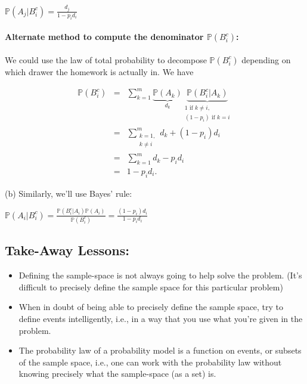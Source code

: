 \documentclass[6008notes.tex]{subfiles}
\begin{document}
{\centering$\mathbb {P}(A_ j|B_ i^ c) = \frac{d_ j}{1-p_ i d_ i}$ \par}
 
\paragraph{Alternate method to compute the denominator $\mathbb {P}(B_ i^ c)$:} We could use the law of total probability to decompose $\mathbb {P}(B_ i^ c)$ depending on which drawer the homework is actually in. We have

\begin{eqnarray*}
        \mathbb{P}(B_i^c) &=& \sum_{k=1}^m
                       \underbrace{\mathbb{P}(A_k)}_{d_k}
                       \underbrace{\mathbb{P}(B_i^c|A_k)}_{\substack{1\text{ if }k\ne i,\\
                                                             (1-p_i)\text{ if }k=i}} \\
                  &=& \sum_{\substack{k=1,\\
                                     k\ne i}}^m d_k
                     + (1-p_i)d_i \\
                  &=& \sum_{k=1}^m d_k - p_i d_i \\
                  &=& 1 - p_i d_i.
\end{eqnarray*}

(b) Similarly, we'll use Bayes' rule:

{\centering$\mathbb {P}(A_ i | B_ i^ c) = \frac{\mathbb {P}(B_ i^ c | A_ i) \mathbb {P}(A_ i)}{\mathbb {P}(B_ i^ c)} = \frac{(1-p_ i) d_ i}{1 - p_ i d_ i}$ \par}
 
\subsection{Take-Away Lessons:}

\begin{itemize}
\item Defining the sample-space is not always going to help solve the problem. (It's difficult to precisely define the sample space for this particular problem)

\item When in doubt of being able to precisely define the sample space, try to define events intelligently, i.e., in a way that you use what you're given in the problem.

\item The probability law of a probability model is a function on events, or subsets of the sample space, i.e., one can work with the probability law without knowing precisely what the sample-space (as a set) is.
\end{itemize}
\end{document}
